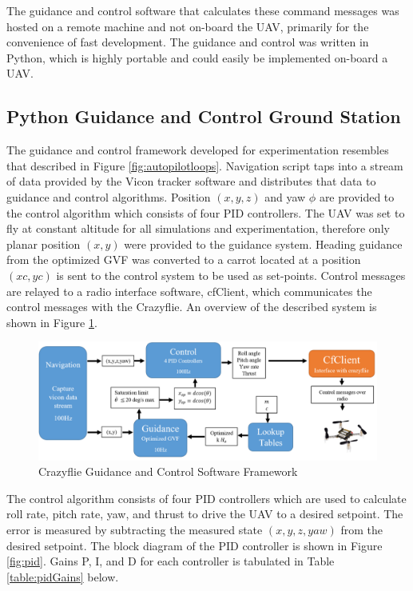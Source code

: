 \documentclass[numbered,pdftex]{ohio-etd}
\begin{document}
The guidance and control software that calculates these command messages was hosted on a remote machine and not on-board the UAV, primarily for the convenience of fast development. The guidance and control was written in Python, which is highly portable and could easily be implemented on-board a UAV. 


\subsection{Python Guidance and Control Ground Station}
The guidance and control framework developed for experimentation resembles that described in Figure \ref{fig:autopilotloops}. Navigation script taps into a stream of data provided by the Vicon tracker software and distributes that data to guidance and control algorithms. Position $(x,y,z)$ and yaw $\phi$ are provided to the control algorithm which consists of four PID controllers. The UAV was set to fly at constant altitude for all simulations and experimentation, therefore only planar position $(x,y)$ were provided to the guidance system. Heading guidance from the optimized GVF was converted to a carrot located at a position $(xc,yc)$ is sent to the control system to be used as set-points. Control messages are relayed to a radio interface software, cfClient, which communicates the control messages with the Crazyflie. An overview of the described system is shown in Figure \ref{fig:cfControlClass}.

\begin{figure}[H]
	\centering
	\includegraphics[trim=0 0 1 0,clip,width=14cm]{PaperFigures/Methods/cfControlClass}
	\caption{Crazyflie Guidance and Control Software Framework}
	\label{fig:cfControlClass}
\end{figure}

The control algorithm consists of four PID controllers which are used to calculate roll rate, pitch rate, yaw, and thrust to drive the UAV to a desired setpoint. The error is measured by subtracting the measured state $(x,y,z,yaw)$ from the desired setpoint. The block diagram of the PID controller is shown in Figure \ref{fig:pid}. Gains P, I, and D for each controller is tabulated in Table \ref{table:pidGains} below. 
\end{document}
